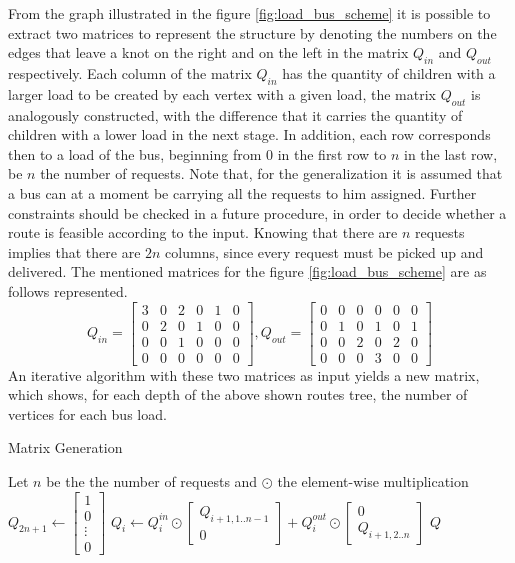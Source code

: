 \documentclass[tuberlin,cic,tc,openright,english,noabntcite,oneside]{iiufrgs}
\begin{document}
From the graph illustrated in the figure \ref{fig:load_bus_scheme} it is possible to extract two matrices to represent the structure by denoting the numbers on the edges that leave a knot on the right and on the left in the matrix $Q_{in}$ and $Q_{out}$ respectively. Each column of the matrix $Q_{in}$ has the quantity of children with a larger load to be created by each vertex with a given load, the matrix $Q_{out}$ is analogously constructed, with the difference that it carries the quantity of children with a lower load in the next stage. In addition, each row corresponds then to a load of the bus, beginning from $0$ in the first row to $n$ in the last row, be $n$ the number of requests. Note that, for the generalization it is assumed that a bus can at a moment be carrying all the requests to him assigned. Further constraints should be checked in a future procedure, in order to decide whether a route is feasible according to the input. Knowing that there are $n$ requests implies that there are $2n$ columns, since every request must be picked up and delivered. The mentioned matrices for the figure \ref{fig:load_bus_scheme} are as follows represented.
$$
Q_{in} = 
\begin{bmatrix}
3 & 0 & 2 & 0 & 1 & 0\\
0 & 2 & 0 & 1 & 0 & 0\\
0 & 0 & 1 & 0 & 0 & 0\\
0 & 0 & 0 & 0 & 0 & 0
\end{bmatrix}
,
Q_{out} = 
\begin{bmatrix}
0 & 0 & 0 & 0 & 0 & 0\\
0 & 1 & 0 & 1 & 0 & 1\\
0 & 0 & 2 & 0 & 2 & 0\\
0 & 0 & 0 & 3 & 0 & 0
\end{bmatrix}
$$
An iterative algorithm with these two matrices as input yields a new matrix, which shows, for each depth of the above shown routes tree, the number of vertices for each bus load.
\begin{algorithm}[H]
\caption{Matrix Generation}
\begin{algorithmic}
\State Let $n$ be the the number of requests and $\odot$ the element-wise multiplication
\State $\displaystyle Q_{2n+1} \gets \begin{bmatrix}1\\ 0 \\ \vdots \\0 \end{bmatrix}$
	\State $\displaystyle Q_{i} \gets Q^{in}_{i} \odot \begin{bmatrix}Q_{i+1,1..n-1} \\ 0\end{bmatrix}
	+ Q^{out}_{i} \odot \begin{bmatrix}0\\ Q_{i+1,2..n}\end{bmatrix}$
\EndFor
\State \Return $Q$
\EndFunction
\end{algorithmic}
\end{algorithm}
\end{document}

